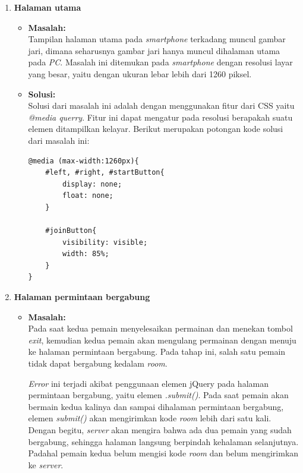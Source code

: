 \begin{enumerate}
	\item \textbf{Halaman utama}
	\begin{itemize}
		\item \textbf{Masalah:} \\
		Tampilan halaman utama pada \textit{smartphone} terkadang muncul gambar jari, dimana seharusnya gambar jari hanya muncul dihalaman utama pada \textit{PC}. Masalah ini ditemukan pada \textit{smartphone} dengan resolusi layar yang besar, yaitu dengan ukuran lebar lebih dari 1260 piksel.
		
		\item \textbf{Solusi:} \\
		Solusi dari masalah ini adalah dengan menggunakan fitur dari CSS yaitu \textit{@media querry}. Fitur ini dapat mengatur pada resolusi berapakah suatu elemen ditampilkan kelayar. Berikut merupakan potongan kode solusi dari masalah ini:
		
\begin{lstlisting}[caption=Fitur CSS \textit{@media querry}, label=lst:mediaQuerry,captionpos=b, frame=single]
@media (max-width:1260px){
	#left, #right, #startButton{
		display: none;
		float: none;
	}
			
	#joinButton{
		visibility: visible;
		width: 85%;
	}
}
\end{lstlisting}
	\end{itemize}

	\item \textbf{Halaman permintaan bergabung}
	\begin{itemize}
		\item \textbf{Masalah:} \\
		Pada saat kedua pemain menyelesaikan permainan dan menekan tombol \textit{exit}, kemudian kedua pemain akan mengulang permainan dengan menuju ke halaman permintaan bergabung. Pada tahap ini, salah satu pemain tidak dapat bergabung kedalam \textit{room}.
		
		\textit{Error} ini terjadi akibat penggunaan elemen jQuery pada halaman permintaan bergabung, yaitu elemen \textit{.submit()}. Pada saat pemain akan bermain kedua kalinya dan sampai dihalaman permintaan bergabung, elemen \textit{submit()} akan mengirimkan kode \textit{room} lebih dari satu kali. Dengan begitu, \textit{server} akan mengira bahwa ada dua pemain yang sudah bergabung, sehingga halaman langsung berpindah kehalaman selanjutnya. Padahal pemain kedua belum mengisi kode \textit{room} dan belum mengirimkan ke \textit{server}.
		

\end{itemize}
\end{enumerate}
